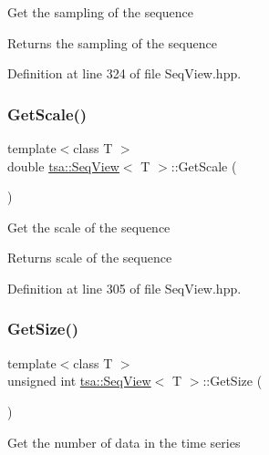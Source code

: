 Get the sampling of the sequence

\begin{DoxyReturn}{Returns}
the sampling of the sequence 
\end{DoxyReturn}


Definition at line 324 of file Seq\+View.\+hpp.

\mbox{\label{classtsa_1_1_seq_view_ae4bf641c5773f23e301602ad89ccfe4b}} 
\subsubsection{\texorpdfstring{Get\+Scale()}{GetScale()}}
{\footnotesize\ttfamily template$<$class T $>$ \\
double \hyperlink{classtsa_1_1_seq_view}{tsa\+::\+Seq\+View}$<$ T $>$\+::Get\+Scale (\begin{DoxyParamCaption}{ }\end{DoxyParamCaption})\hspace{0.3cm}{\ttfamily [inline]}}

Get the scale of the sequence

\begin{DoxyReturn}{Returns}
scale of the sequence 
\end{DoxyReturn}


Definition at line 305 of file Seq\+View.\+hpp.

\mbox{\label{classtsa_1_1_seq_view_ace63410a473e9865f9114583e793f19e}} 
\subsubsection{\texorpdfstring{Get\+Size()}{GetSize()}}
{\footnotesize\ttfamily template$<$class T $>$ \\
unsigned int \hyperlink{classtsa_1_1_seq_view}{tsa\+::\+Seq\+View}$<$ T $>$\+::Get\+Size (\begin{DoxyParamCaption}{ }\end{DoxyParamCaption})\hspace{0.3cm}{\ttfamily [inline]}}

Get the number of data in the time series

